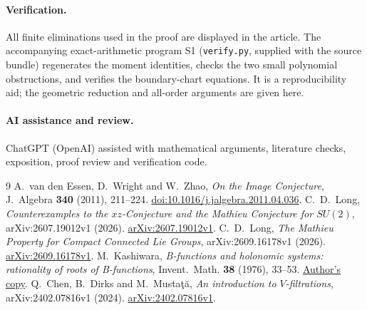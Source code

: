 \documentclass[11pt]{article}
\theoremstyle{remark}\newtheorem{remark}[theorem]{Remark}
\begin{document}
\paragraph{Verification.}
All finite eliminations used in the proof are displayed in the article.
The accompanying exact-arithmetic program S1 (\texttt{verify.py}, supplied with the source bundle) regenerates the moment
identities, checks the two small polynomial obstructions, and verifies
the boundary-chart equations. It is a reproducibility aid; the geometric
reduction and all-order arguments are given here.

\paragraph{AI assistance and review.}
ChatGPT (OpenAI) assisted with mathematical arguments, literature checks,
exposition, proof review and verification code.

\begin{thebibliography}{9}
A.~van den Essen, D.~Wright and W.~Zhao,
\emph{On the Image Conjecture}, J.~Algebra \textbf{340} (2011), 211--224.
\href{https://doi.org/10.1016/j.jalgebra.2011.04.036}{doi:10.1016/j.jalgebra.2011.04.036}.
C.~D.~Long,
\emph{Counterexamples to the \(xz\)-Conjecture and the Mathieu Conjecture
for \(SU(2)\)}, arXiv:2607.19012v1 (2026).
\href{https://arxiv.org/abs/2607.19012v1}{arXiv:2607.19012v1}.
C.~D.~Long, \emph{The Mathieu Property for Compact Connected Lie Groups},
arXiv:2609.16178v1 (2026).
\href{https://arxiv.org/abs/2609.16178v1}{arXiv:2609.16178v1}.
M.~Kashiwara, \emph{B-functions and holonomic systems: rationality of
roots of B-functions}, Invent.~Math. \textbf{38} (1976), 33--53.
\href{https://www.kurims.kyoto-u.ac.jp/~kenkyubu/kashiwara/Bfunct.pdf}{Author's copy}.
Q.~Chen, B.~Dirks and M.~Musta\c t\u a,
\emph{An introduction to \(V\)-filtrations}, arXiv:2402.07816v1 (2024).
\href{https://arxiv.org/abs/2402.07816v1}{arXiv:2402.07816v1}.
\end{thebibliography}
\end{document}
